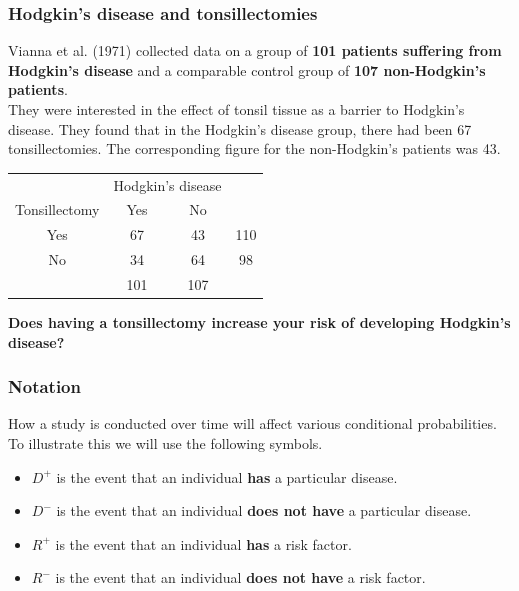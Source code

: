 \documentclass[a4paper]{article}\usepackage[]{graphicx}\usepackage[]{xcolor}
\begin{document}
\subsubsection{Hodgkin's disease and tonsillectomies}
Vianna et al. (1971) collected data on a group of \textbf{101 patients suffering from Hodgkin's disease} and a comparable control group of \textbf{107 non-Hodgkin's patients}.\\
They were interested in the effect of tonsil tissue as a barrier to Hodgkin's disease. They found that in the Hodgkin's disease group, there had been 67 tonsillectomies. The corresponding figure for the non-Hodgkin's patients was 43.
\begin{table}[H]
	\centering
	\begin{tabular}{@{}ccc|c@{}}
		\toprule
					  & \multicolumn{2}{c}{Hodgkin's disease} &     \\
		Tonsillectomy & Yes                & No                &     \\ \midrule
		Yes           & 67                 & 43                & 110 \\
		No            & 34                 & 64                & 98  \\ \midrule
					  & 101                & 107               &     \\ \bottomrule
		\end{tabular}
\end{table}
\begin{greenbox}
	\textbf{Does having a tonsillectomy increase your risk of developing Hodgkin's disease?}
\end{greenbox}
\subsubsection{Notation}
How a study is conducted over time will affect various conditional probabilities.\\
To illustrate this we will use the following symbols.
\begin{itemize}
	\item \textcolor{mygreen}{\( D^+ \)} is the event that an individual \textbf{has} a particular disease.
	\item \textcolor{mygreen}{\( D^- \)} is the event that an individual \textbf{does not have} a particular disease.
	\item \textcolor{myred}{\( R^+ \)} is the event that an individual \textbf{has} a risk factor.
	\item \textcolor{myred}{\( R^- \)} is the event that an individual \textbf{does not have} a risk factor.
\end{itemize}
\end{document}
